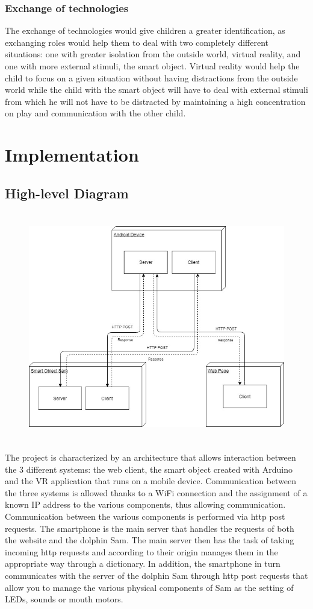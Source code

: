 \documentclass [12pt]{article}
\begin{document}
\subsubsection{Exchange of technologies}
The exchange of technologies would give children a greater identification, as exchanging roles would help them to deal with two completely different situations: one with greater isolation from the outside world, virtual reality, and one with more external stimuli, the smart object.
Virtual reality would help the child to focus on a given situation without having distractions from the outside world while the child with the smart object will have to deal with external stimuli from which he will not have to be distracted by maintaining a high concentration on play and communication with the other child.
\section{Implementation}
\subsection{High-level Diagram}

\begin{figure}[ht!]
\centering
\includegraphics[height=10cm,width=13cm]{HWarchitecture.jpg}
\end{figure}   
The project is characterized by an architecture that allows interaction between the 3 different systems: the web client, the smart object created with Arduino and the VR application that runs on a mobile device.
Communication between the three systems is allowed thanks to a WiFi connection and the assignment of a known IP address to the various components, thus allowing communication. 
Communication between the various components is performed via http post requests.
The smartphone is the main server that handles the requests of both the website and the dolphin Sam. The main server then has the task of taking incoming http requests and according to their origin manages them in the appropriate way through a dictionary. In addition, the smartphone in turn communicates with the server of the dolphin Sam through http post requests that allow you to manage the various physical components of Sam as the setting of LEDs, sounds or mouth motors.
\clearpage
\end{document}
